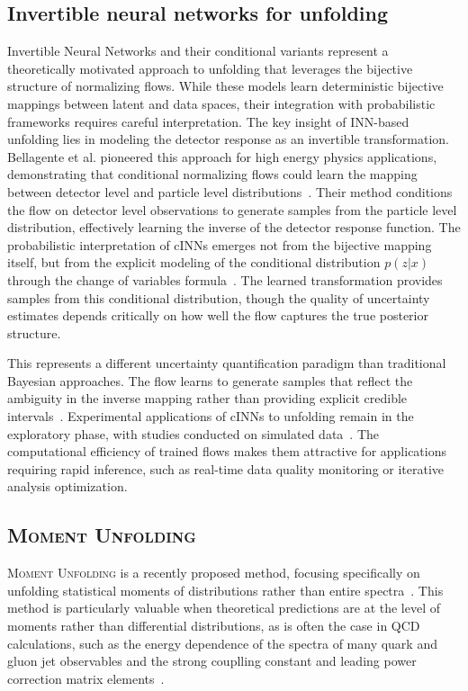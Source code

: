 \subsection{Invertible neural networks for unfolding}
    Invertible Neural Networks and their conditional variants represent a theoretically motivated approach to unfolding that leverages the bijective structure of normalizing flows.
    While these models learn deterministic bijective mappings between latent and data spaces, their integration with probabilistic frameworks requires careful interpretation.
    The key insight of INN-based unfolding lies in modeling the detector response as an invertible transformation.
    Bellagente et al. pioneered this approach for high energy physics applications, demonstrating that conditional normalizing flows could learn the mapping between detector level and particle level distributions~\cite{bellagente_how_2020}.
    Their method conditions the flow on detector level observations to generate samples from the particle level distribution, effectively learning the inverse of the detector response function.
    The probabilistic interpretation of cINNs emerges not from the bijective mapping itself, but from the explicit modeling of the conditional distribution $p(z|x)$ through the change of variables formula~\cite{Backes:2022sph}.
    The learned transformation provides samples from this conditional distribution, though the quality of uncertainty estimates depends critically on how well the flow captures the true posterior structure.
    
    This represents a different uncertainty quantification paradigm than traditional Bayesian approaches.
    The flow learns to generate samples that reflect the ambiguity in the inverse mapping rather than providing explicit credible intervals~\cite{AnanthaPadmanabha2021SolvingNetworks}.
    Experimental applications of cINNs to unfolding remain in the exploratory phase, with studies conducted on simulated data~\cite{Backes:2022sph}.
    The computational efficiency of trained flows makes them attractive for applications requiring rapid inference, such as real-time data quality monitoring or iterative analysis optimization.

    \subsection{\textsc{Moment Unfolding}}
    \textsc{Moment Unfolding} is a recently proposed method, focusing specifically on unfolding statistical moments of distributions rather than entire spectra~\cite{desai2024moment}.
    This method is particularly valuable when theoretical predictions are at the level of moments rather than differential distributions, as is often the case in QCD calculations, such as the energy dependence of the spectra of many quark and gluon jet observables and the strong couplling constant and leading power correction matrix elements~\cite{Abbate:2012jh,pahlStudyMomentsEvent2009,OPAL:2004wof,L3:2004cdh,DELPHI:2004omy,DELPHI:2003yqh,Altarelli:1977zs,gribovDeepInelasticEp1972,dokshitzerCalculationStructureFunctions1977}.

